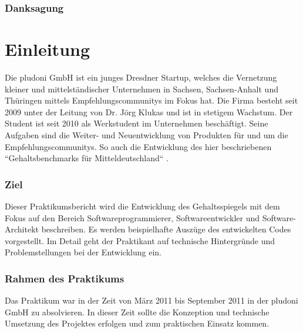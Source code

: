 \section{Danksagung}
\part{Einleitung}
Die pludoni GmbH ist ein junges Dresdner Startup, welches die Vernetzung kleiner und mittelständischer Unternehmen in Sachsen, Sachsen-Anhalt und Thüringen 
mittels Empfehlungscommunitys im Fokus hat. Die Firma besteht seit 2009 unter der Leitung von Dr. Jörg Klukas und ist in stetigem Wachstum. 
Der Student ist seit 2010 als Werkstudent im Unternehmen beschäftigt. Seine Aufgaben sind die Weiter- und Neuentwicklung von Produkten für und um die Empfehlungscommunitys. 
So auch die Entwicklung des hier beschriebenen ``Gehaltsbenchmarks für Mitteldeutschland`` \cite{Gehaltsbenchmark}.
\section{Ziel}
Dieser Praktikumsbericht wird die Entwicklung des Gehaltsspiegels mit dem Fokus auf den Bereich Softwareprogrammierer, Softwareentwickler und Software-Architekt beschreiben. 
Es werden beispielhafte Auszüge des entwickelten Codes vorgestellt. Im Detail geht der Praktikant auf technische Hintergründe und Problemstellungen bei der Entwicklung ein.
\section{Rahmen des Praktikums}
Das Praktikum war in der Zeit von März 2011 bis September 2011 in der pludoni GmbH zu absolvieren. 
In dieser Zeit sollte die Konzeption und technische Umsetzung des Projektes erfolgen und zum praktischen Einsatz kommen.
